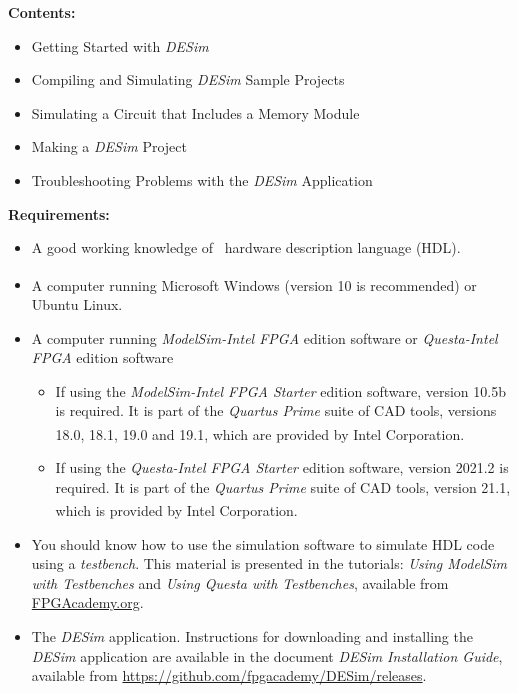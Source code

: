 {\bf Contents:}
\vspace{-1em}
\begin{itemize}
\item Getting Started with {\it DESim}
\item Compiling and Simulating {\it DESim} Sample Projects
\item Simulating a Circuit that Includes a Memory Module
\item Making a {\it DESim} Project
\item Troubleshooting Problems with the {\it DESim} Application
\end{itemize}

{\bf Requirements:}
\vspace{-1em}
\begin{itemize}
	\item A good working knowledge of \hdlName~hardware description language (HDL).
\item A computer running Microsoft\textsuperscript{\textregistered} Windows\textsuperscript{\textregistered} (version 10 is recommended) 
	or Ubuntu Linux.
\item A computer running {\it ModelSim-Intel FPGA} edition software or {\it Questa-Intel FPGA} edition software
\begin{itemize}
	\item If using the {\it ModelSim-Intel FPGA Starter} edition software, version 10.5b is required. It is
		part of the {\it Quartus Prime} suite of CAD tools, versions 18.0, 18.1, 19.0 and 19.1, which are
		provided by Intel\textsuperscript{\textregistered} Corporation.
	\item If using the {\it Questa-Intel FPGA Starter} edition software, version 2021.2 is required. It is
		part of the {\it Quartus Prime} suite of CAD tools, version 21.1, which is
		provided by Intel\textsuperscript{\textregistered} Corporation.
\end{itemize}
\item You should know how to use the simulation software to simulate HDL code using a {\it testbench}. 
	This material is presented in the tutorials: 
		{\it Using ModelSim with Testbenches} and 
		{\it Using Questa with Testbenches}, available from
		\href{https://www.fpgacademy.org/tutorials.html}{FPGAcademy.org}.
\item The {\it DESim} application. Instructions for downloading and installing the {\it DESim} 
application are available in the document {\it DESim Installation Guide}, available from
\url{https://github.com/fpgacademy/DESim/releases}.
\end{itemize}

